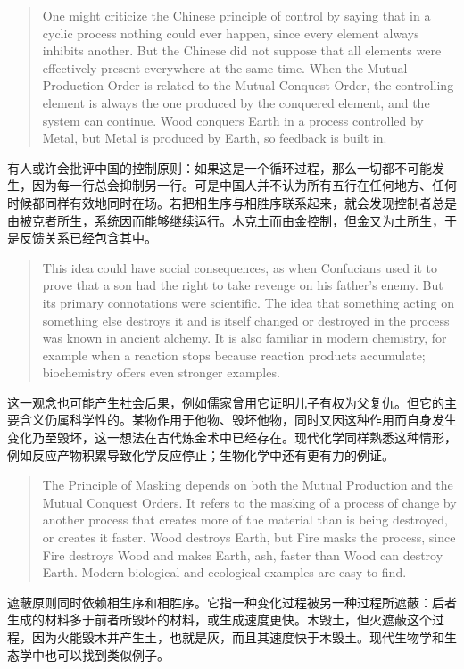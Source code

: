 \documentclass[UTF8,zihao=-4]{ctexart}
\newenvironment{enblock}
  {\par\smallskip\noindent{\scriptsize\bfseries English}\par\begin{quote}\small}
  {\end{quote}}
\newenvironment{zhblock}
  {\par\noindent{\scriptsize\bfseries 中文}\par}
  {\par\medskip}
\begin{document}
\begin{enblock}
One might criticize the Chinese principle of control by saying that in a cyclic process nothing could ever happen, since every element always inhibits another. But the Chinese did not suppose that all elements were effectively present everywhere at the same time. When the Mutual Production Order is related to the Mutual Conquest Order, the controlling element is always the one produced by the conquered element, and the system can continue. Wood conquers Earth in a process controlled by Metal, but Metal is produced by Earth, so feedback is built in.
\end{enblock}
\begin{zhblock}
有人或许会批评中国的控制原则：如果这是一个循环过程，那么一切都不可能发生，因为每一行总会抑制另一行。可是中国人并不认为所有五行在任何地方、任何时候都同样有效地同时在场。若把相生序与相胜序联系起来，就会发现控制者总是由被克者所生，系统因而能够继续运行。木克土而由金控制，但金又为土所生，于是反馈关系已经包含其中。
\end{zhblock}

\begin{enblock}
This idea could have social consequences, as when Confucians used it to prove that a son had the right to take revenge on his father's enemy. But its primary connotations were scientific. The idea that something acting on something else destroys it and is itself changed or destroyed in the process was known in ancient alchemy. It is also familiar in modern chemistry, for example when a reaction stops because reaction products accumulate; biochemistry offers even stronger examples.
\end{enblock}
\begin{zhblock}
这一观念也可能产生社会后果，例如儒家曾用它证明儿子有权为父复仇。但它的主要含义仍属科学性的。某物作用于他物、毁坏他物，同时又因这种作用而自身发生变化乃至毁坏，这一想法在古代炼金术中已经存在。现代化学同样熟悉这种情形，例如反应产物积累导致化学反应停止；生物化学中还有更有力的例证。
\end{zhblock}

\begin{enblock}
The Principle of Masking depends on both the Mutual Production and the Mutual Conquest Orders. It refers to the masking of a process of change by another process that creates more of the material than is being destroyed, or creates it faster. Wood destroys Earth, but Fire masks the process, since Fire destroys Wood and makes Earth, ash, faster than Wood can destroy Earth. Modern biological and ecological examples are easy to find.
\end{enblock}
\begin{zhblock}
遮蔽原则同时依赖相生序和相胜序。它指一种变化过程被另一种过程所遮蔽：后者生成的材料多于前者所毁坏的材料，或生成速度更快。木毁土，但火遮蔽这个过程，因为火能毁木并产生土，也就是灰，而且其速度快于木毁土。现代生物学和生态学中也可以找到类似例子。
\end{zhblock}
\end{document}
